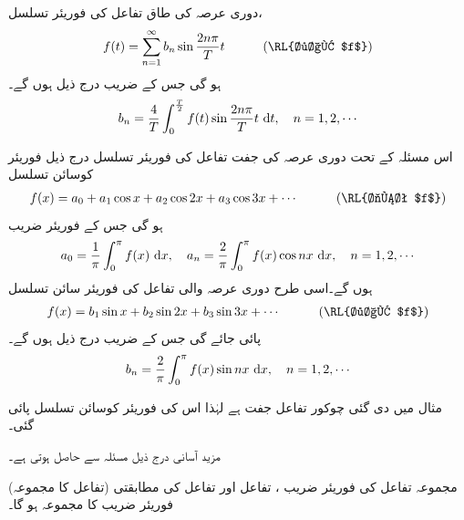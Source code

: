 دوری عرصہ  کی طاق تفاعل  کی فوریئر تسلسل، 
\begin{align}\label{مساوات_فوریئر_طاق_فوریئر_تسلسل}
f(t)=\sum_{n=1}^{\infty} b_n\sin \frac{2n\pi}{T}t\quad \quad \quad (\text{\RL{طاق $f$}})
\end{align}
 ہو گی جس کے  ضریب  درج ذیل ہوں گے۔
\begin{align}\label{مساوات_فوریئر_طاق_تسلسل_عددی_سر}
b_n=\frac{4}{T}\int_{0}^{\frac{T}{2}}f(t)\sin \frac{2n\pi}{T}t\,\dif t,\quad n=1,2,\cdots
\end{align}

اس مسئلہ کے تحت دوری عرصہ  کی جفت تفاعل  کی فوریئر تسلسل درج ذیل فوریئر کوسائن تسلسل 
\begin{align}
f(x)=a_0+a_1\cos x+a_2\cos 2x+a_3\cos 3x+\cdots\quad \quad \quad (\text{\RL{جفت $f$}})
\end{align} 
ہو گی جس کے فوریئر  ضریب  
\begin{align}
a_0=\frac{1}{\pi}\int_0^{\pi}f(x)\,\dif x,\quad a_n=\frac{2}{\pi}\int_0^{\pi} f(x)\cos nx\,\dif x,\quad n=1,2,\cdots
\end{align}
ہوں گے۔اسی طرح دوری عرصہ  والی تفاعل  کی فوریئر سائن تسلسل 
\begin{align}
f(x)=b_1\sin x+b_2\sin 2x+b_3\sin 3x+\cdots\quad \quad \quad (\text{\RL{طاق $f$}})
\end{align}
پائی جائے گی جس کے  ضریب  درج ذیل ہوں گے۔
\begin{align}
b_n=\frac{2}{\pi}\int_0^{\pi}f(x)\sin nx\,\dif x,\quad n=1,2,\cdots
\end{align}

مثال  میں دی گئی چوکور تفاعل جفت ہے لہٰذا اس کی فوریئر کوسائن تسلسل پائی گئی۔ 

مزید آسانی درج ذیل مسئلہ سے حاصل ہوتی ہے۔

\quad (تفاعل کا مجموعہ)
مجموعہ تفاعل  کی فوریئر  ضریب ،  تفاعل   اور تفاعل  کی مطابقتی فوریئر  ضریب  کا مجموعہ ہو گا۔ 

